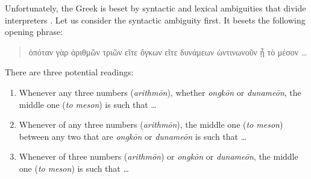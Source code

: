 Unfortunately, the Greek is beset by syntactic and lexical ambiguities that divide interpreters \citep{Prtichard:1990aa}. Let us consider the syntactic ambiguity first. It besets the following opening phrase:
\begin{quote}
{\sbl ὁπόταν γὰρ ἀριθμῶν τριῶν εἴτε ὄγκων εἴτε δυνάμεων ὡντινωνοῦν ᾖ τὸ μέσον \ldots}
\end{quote}
There are three potential readings:
\begin{enumerate}[(1)]
	\item Whenever any three numbers (\emph{arithmōn}), whether \emph{ongkōn} or \emph{dunameōn}, the middle one (\emph{to meson}) is such that \ldots
	\item Whenever of any three numbers (\emph{arithmōn}), the middle one (\emph{to meson}) between any two that are \emph{ongkōn} or \emph{dunameōn} is such that \ldots
	\item Whenever of three numbers  (\emph{arithmōn}) or \emph{ongkōn} or \emph{dunameōn}, the middle one (\emph{to meson}) is such that \ldots
\end{enumerate}
